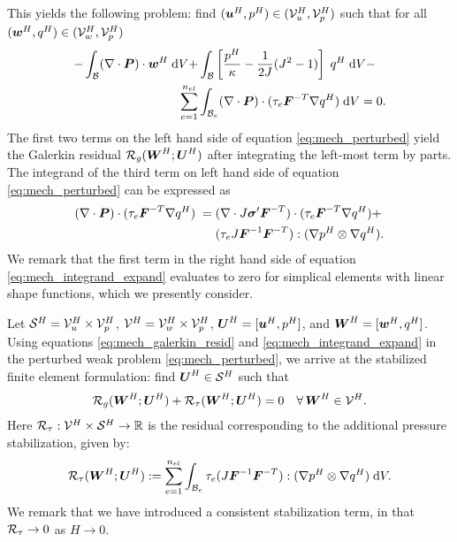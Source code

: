 This yields the following problem: find $(\boldsymbol{u}^H, p^H) \in (\mathcal{V}^H_u, \mathcal{V}^H_p)$
such that for all $(\boldsymbol{w}^H, q^H) \in (\mathcal{V}^H_w, \mathcal{V}^H_p)$
%
\begin{gather}
\begin{split}
- \int_{\mathcal{B}} (\nabla \cdot \boldsymbol{P}) \cdot \boldsymbol{w}^H \; \text{d} V +
& \int_{\mathcal{B}} \left[ \frac{p^H}{\kappa} - \frac{1}{2 J}(J^2 - 1) \right] \;
q^H \; \text{d} V - \\
\sum_{e=1}^{n_{el}} & \int_{\mathcal{B}_e} (\nabla \cdot \boldsymbol{P}) \cdot
(\tau_e \boldsymbol{F}^{-T} \nabla q^H) \; \text{d} V = 0.
\label{eq:mech_perturbed}
\end{split}
\end{gather}
%
The first two terms on the left hand side of equation
\eqref{eq:mech_perturbed} yield the Galerkin residual
$\mathcal{R}_g(\boldsymbol{W}^H ; \boldsymbol{U}^H)$ after integrating the left-most term by parts.
The integrand of the third term on left hand side of equation
\eqref{eq:mech_perturbed} can be expressed as
%
\begin{gather}
\begin{split}
(\nabla \cdot \boldsymbol{P}) \cdot (\tau_e \boldsymbol{F}^{-T} \nabla q^H) \; = \;
&(\nabla \cdot J \boldsymbol{\sigma}' \boldsymbol{F}^{-T} ) \cdot
(\tau_e \boldsymbol{F}^{-T} \nabla q^H) + \\
&(\tau_e J \boldsymbol{F}^{-1} \boldsymbol{F}^{-T}) : (\nabla p^H \otimes \nabla q^H).
\label{eq:mech_integrand_expand}
\end{split}
\end{gather}
%
We remark that the first term in the right hand side of equation
\eqref{eq:mech_integrand_expand} evaluates to zero for simplical elements
with linear shape functions, which we presently consider.

Let $\mathcal{S}^H = \mathcal{V}^H_u \times \mathcal{V}^H_p$, $\mathcal{V}^H = \mathcal{V}^H_w \times \mathcal{V}^H_p$,
$\boldsymbol{U}^H = [ \boldsymbol{u}^H, p^H ]$, and $\boldsymbol{W}^H = [ \boldsymbol{w}^H, q^H ]$.
Using equations \eqref{eq:mech_galerkin_resid} and
\eqref{eq:mech_integrand_expand} in the perturbed weak problem
\eqref{eq:mech_perturbed}, we arrive at the stabilized finite element
formulation: find $\boldsymbol{U}^H \in \mathcal{S}^H$ such that
%
\begin{gather}
\mathcal{R}_g(\boldsymbol{W}^H ; \boldsymbol{U}^H) + \mathcal{R}_{\tau}(\boldsymbol{W}^H ; \boldsymbol{U}^H) = 0
\quad \forall \, \boldsymbol{W}^H \in \mathcal{V}^H.
\label{eq:mech_stabilized_fem}
\end{gather}
%
Here $\mathcal{R}_{\tau} : \mathcal{V}^H \times \mathcal{S}^H \to \mathbb{R}$ is the residual
corresponding to the additional pressure stabilization, given by:
%
\begin{gather}
\mathcal{R}_{\tau}(\boldsymbol{W}^H ; \boldsymbol{U}^H) :=
\sum_{e=1}^{n_{el}} \int_{\mathcal{B}_e} \tau_e
(J \boldsymbol{F}^{-1} \boldsymbol{F}^{-T}) : (\nabla p^H \otimes \nabla q^H) \; \text{d} V.
\end{gather}
%
We remark that we have introduced a consistent stabilization term, in that
$\mathcal{R}_{\tau} \to 0$ as $H \to 0$.

